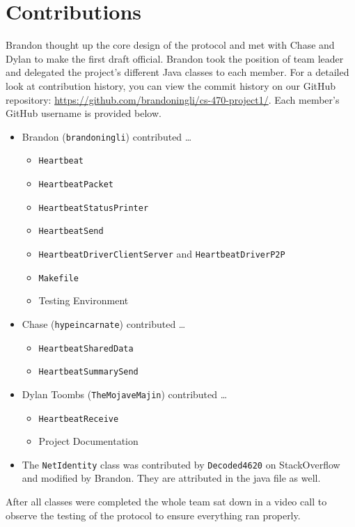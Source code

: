 \documentclass[11pt]{article}
\begin{document}
  \section{Contributions}
  Brandon thought up the core design of the protocol and met with Chase and
  Dylan to make the first draft official. Brandon took the position of team
  leader and delegated the project's different Java classes to each member. For 
  a detailed look at contribution history, you can view the commit history on 
  our GitHub repository: \url{https://github.com/brandoningli/cs-470-project1/}. 
  Each member's GitHub username is provided below.
  \begin{itemize}
    \item Brandon (\texttt{brandoningli}) contributed \dots
    \begin{itemize}
      \item \texttt{Heartbeat}
      \item \texttt{HeartbeatPacket}
      \item \texttt{HeartbeatStatusPrinter}
      \item \texttt{HeartbeatSend}
      \item \texttt{HeartbeatDriverClientServer} and \texttt{HeartbeatDriverP2P}
      \item \texttt{Makefile}
      \item Testing Environment
    \end{itemize}
    \item Chase (\texttt{hypeincarnate}) contributed \dots
    \begin{itemize}
      \item \texttt{HeartbeatSharedData}
      \item \texttt{HeartbeatSummarySend}
    \end{itemize}
    \item Dylan Toombs (\texttt{TheMojaveMajin}) contributed \dots
    \begin{itemize}
      \item \texttt{HeartbeatReceive}
      \item Project Documentation
    \end{itemize}
    \item The \texttt{NetIdentity} class was contributed by \texttt{Decoded4620} 
    on StackOverflow and modified by Brandon. They are attributed in the java 
    file as well.
  \end{itemize}

  After all classes were completed the whole team sat down in a video call to
  observe the testing of the protocol to ensure everything ran properly.
\end{document}
